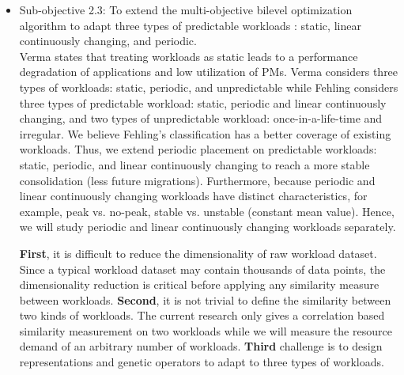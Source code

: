 \begin{itemize}

	\item Sub-objective 2.3: To extend the multi-objective bilevel optimization algorithm to adapt three types of predictable workloads \cite{Fehling:2014tl}: static, linear continuously changing, and periodic. \\
	
	 Verma \cite{Verma:2009wi} states that treating workloads as static leads to a performance degradation of applications and low utilization of PMs. Verma considers three types of workloads: static, periodic, and unpredictable while Fehling \cite{Fehling:2014tl} considers three types of predictable workload: static, periodic and linear continuously changing, and two types of unpredictable workload: once-in-a-life-time and irregular. We believe Fehling's classification has a better coverage of existing workloads. Thus, we extend periodic placement on predictable workloads: static, periodic, and linear continuously changing to reach a more stable consolidation (less future migrations). Furthermore, because periodic and linear continuously changing workloads have distinct characteristics, for example, peak vs. no-peak, stable vs. unstable (constant mean value). Hence, we will study periodic and linear continuously changing workloads separately.

	\textbf{First}, it is difficult to reduce the dimensionality of raw workload dataset. Since a typical workload dataset may contain thousands of data points, the dimensionality reduction is critical before applying any similarity measure between workloads. \textbf{Second}, it is not trivial to define the similarity between two kinds of workloads. The current research \cite{Verma:2009wi} only gives a correlation based similarity measurement on two workloads while we will measure the resource demand of an arbitrary number of workloads. \textbf{Third} challenge is to design representations and genetic operators to adapt to three types of workloads.


\end{itemize}
